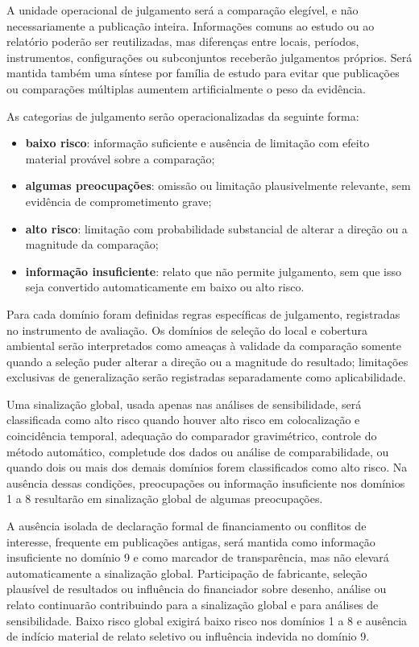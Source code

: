 \documentclass[11pt,a4paper]{article}
\begin{document}
A unidade operacional de julgamento será a comparação elegível, e não necessariamente
a publicação inteira. Informações comuns ao estudo ou ao relatório poderão ser
reutilizadas, mas diferenças entre locais, períodos, instrumentos, configurações ou
subconjuntos receberão julgamentos próprios. Será mantida também uma síntese por
família de estudo para evitar que publicações ou comparações múltiplas aumentem
artificialmente o peso da evidência.

As categorias de julgamento serão operacionalizadas da seguinte forma:

\begin{itemize}
  \item \textbf{baixo risco}: informação suficiente e ausência de limitação com efeito
  material provável sobre a comparação;
  \item \textbf{algumas preocupações}: omissão ou limitação plausivelmente relevante,
  sem evidência de comprometimento grave;
  \item \textbf{alto risco}: limitação com probabilidade substancial de alterar a
  direção ou a magnitude da comparação;
  \item \textbf{informação insuficiente}: relato que não permite julgamento, sem que
  isso seja convertido automaticamente em baixo ou alto risco.
\end{itemize}

Para cada domínio foram definidas regras específicas de julgamento, registradas no
instrumento de avaliação. Os domínios de seleção do local e cobertura ambiental serão
interpretados como ameaças à validade da comparação somente quando a seleção puder
alterar a direção ou a magnitude do resultado; limitações exclusivas de generalização
serão registradas separadamente como aplicabilidade.

Uma sinalização global, usada apenas nas análises de sensibilidade, será classificada
como alto risco quando houver alto risco em colocalização e coincidência temporal,
adequação do comparador gravimétrico, controle do método automático, completude dos
dados ou análise de comparabilidade, ou quando dois ou mais dos demais domínios forem
classificados como alto risco. Na ausência dessas condições, preocupações ou informação
insuficiente nos domínios 1 a 8 resultarão em sinalização global de algumas
preocupações.

A ausência isolada de declaração formal de financiamento ou conflitos de interesse,
frequente em publicações antigas, será mantida como informação insuficiente no domínio
9 e como marcador de transparência, mas não elevará automaticamente a sinalização
global. Participação de fabricante, seleção plausível de resultados ou influência do
financiador sobre desenho, análise ou relato continuarão contribuindo para a
sinalização global e para análises de sensibilidade. Baixo risco global exigirá baixo
risco nos domínios 1 a 8 e ausência de indício material de relato seletivo ou influência
indevida no domínio 9.
\end{document}
